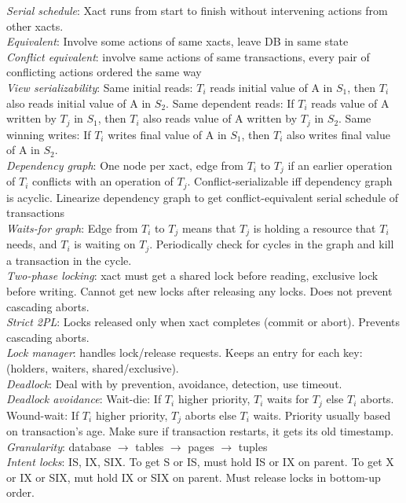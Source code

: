 \documentclass[10pt,landscape]{article}
\begin{document}
\begin{multicols}{3}
\textit{Serial schedule}: Xact runs from start to finish without intervening actions from other xacts. \\
\textit{Equivalent}: Involve some actions of same xacts, leave DB in same state \\
\textit{Conflict equivalent}: involve same actions of same transactions, every pair of conflicting actions ordered the same way \\
\textit{View serializability}: Same initial reads: $T_i$ reads initial value of A in $S_1$, then $T_i$ also reads initial value of A in $S_2$. Same dependent reads: If $T_i$ reads value of A written by $T_j$ in $S_1$, then $T_i$ also reads value of A written by $T_j$ in $S_2$. Same winning writes: If $T_i$ writes final value of A in $S_1$, then $T_i$ also writes final value of A in $S_2$. \\
\textit{Dependency graph}: One node per xact, edge from $T_i$ to $T_j$ if an earlier operation of $T_i$ conflicts with an operation of $T_j$. Conflict-serializable iff dependency graph is acyclic. Linearize dependency graph to get conflict-equivalent serial schedule of transactions \\
\textit{Waits-for graph}: Edge from $T_i$ to $T_j$ means that $T_j$ is holding a resource that $T_i$ needs, and $T_i$ is waiting on $T_j$. Periodically check for cycles in the graph and kill a transaction in the cycle. \\
\textit{Two-phase locking}: xact must get a shared lock before reading, exclusive lock before writing. Cannot get new locks after releasing any locks. Does not prevent cascading aborts. \\
\textit{Strict 2PL}: Locks released only when xact completes (commit or abort). Prevents cascading aborts. \\
\textit{Lock manager}: handles lock/release requests. Keeps an entry for each key: (holders, waiters, shared/exclusive). \\
\textit{Deadlock}: Deal with by prevention, avoidance, detection, use timeout. \\
\textit{Deadlock avoidance}: Wait-die: If $T_i$ higher priority, $T_i$ waits for $T_j$ else $T_i$ aborts. Wound-wait: If $T_i$ higher priority, $T_j$ aborts else $T_i$ waits. Priority usually based on transaction's age. Make sure if transaction restarts, it gets its old timestamp. \\
\textit{Granularity}: database $\rightarrow$ tables $\rightarrow$ pages $\rightarrow$ tuples \\
\textit{Intent locks}: IS, IX, SIX. To get S or IS, must hold IS or IX on parent. To get X or IX or SIX, mut hold IX or SIX on parent. Must release locks in bottom-up order.



\end{multicols}
\end{document}
